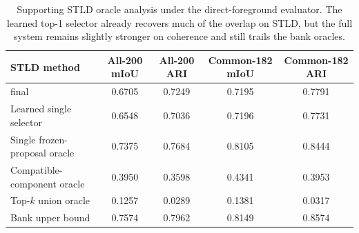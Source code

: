 \begin{table}[t]
\centering
\scriptsize
\setlength{\tabcolsep}{5pt}
\renewcommand{\arraystretch}{0.98}
\begin{tabular}{@{}lcccc@{}}
\toprule
STLD method & All-200 mIoU & All-200 ARI & Common-182 mIoU & Common-182 ARI \\
\midrule
\sys{} final & 0.6705 & 0.7249 & 0.7195 & 0.7791 \\
Learned single selector & 0.6548 & 0.7036 & 0.7196 & 0.7731 \\
Single frozen-proposal oracle & 0.7375 & 0.7684 & 0.8105 & 0.8444 \\
Compatible-component oracle & 0.3950 & 0.3598 & 0.4341 & 0.3953 \\
Top-$k$ union oracle & 0.1257 & 0.0289 & 0.1381 & 0.0317 \\
Bank upper bound & 0.7574 & 0.7962 & 0.8149 & 0.8574 \\
\bottomrule
\end{tabular}
\caption{Supporting STLD oracle analysis under the direct-foreground evaluator. The learned top-1 selector already recovers much of the overlap on STLD, but the full system remains slightly stronger on coherence and still trails the bank oracles.}
\label{tab:stld_oracles}
\end{table}
